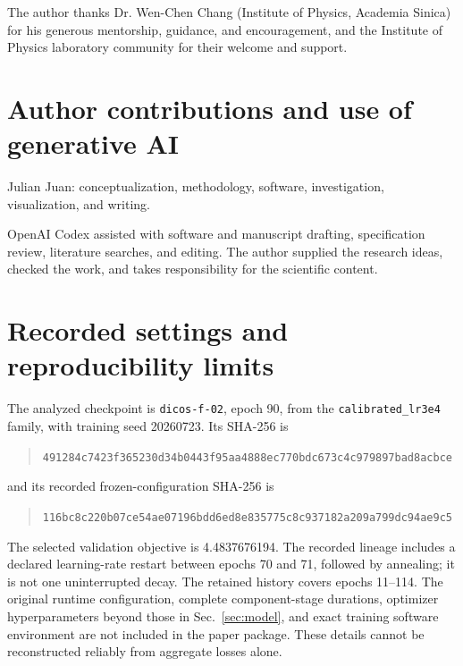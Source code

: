 \documentclass[11pt]{article}
\begin{document}
The author thanks Dr. Wen-Chen Chang (Institute of Physics, Academia Sinica) for his generous mentorship, guidance, and encouragement, and the Institute of Physics laboratory community for their welcome and support.

\section*{Author contributions and use of generative AI}

Julian Juan: conceptualization, methodology, software, investigation, visualization, and writing.

OpenAI Codex assisted with software and manuscript drafting, specification review, literature searches, and editing. The author supplied the research ideas, checked the work, and takes responsibility for the scientific content.


\appendix
\section{Recorded settings and reproducibility limits}
\label{app:reproducibility}

The analyzed checkpoint is \texttt{dicos-f-02}, epoch 90, from the \texttt{calibrated\_lr3e4} family, with training seed 20260723. Its SHA-256 is
\begin{quote}\footnotesize\nolinkurl{491284c7423f365230d34b0443f95aa4888ec770bdc673c4c979897bad8acbce}\end{quote}
and its recorded frozen-configuration SHA-256 is
\begin{quote}\footnotesize\nolinkurl{116bc8c220b07ce54ae07196bdd6ed8e835775c8c937182a209a799dc94ae9c5}\end{quote}
The selected validation objective is 4.4837676194. The recorded lineage includes a declared learning-rate restart between epochs 70 and 71, followed by annealing; it is not one uninterrupted decay. The retained history covers epochs 11--114. The original runtime configuration, complete component-stage durations, optimizer hyperparameters beyond those in Sec.~\ref{sec:model}, and exact training software environment are not included in the paper package. These details cannot be reconstructed reliably from aggregate losses alone.
\end{document}
